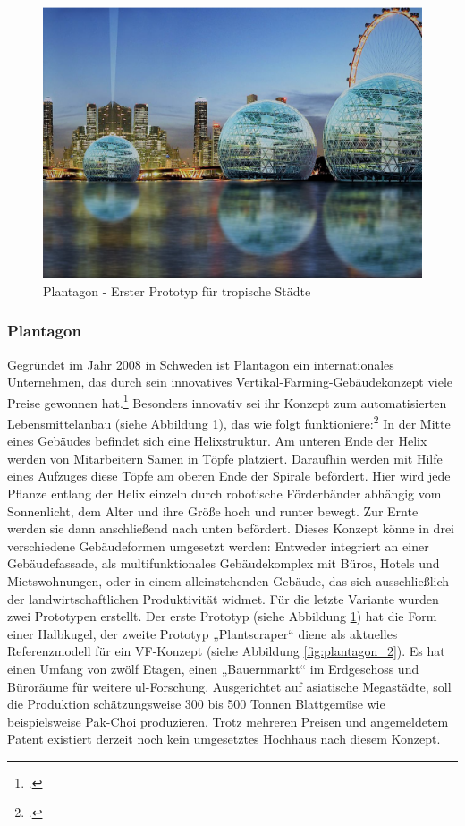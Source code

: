 \documentclass{scrartcl}
\begin{document}
\begin{figure}[htbp]
    \centering
    \includegraphics[width=12cm]{image_folder/plantagon.png}
  \caption{Plantagon - Erster Prototyp für tropische Städte}
  \label{fig:plantagon}
\end{figure} 

\subsubsection{Plantagon}

Gegründet im Jahr 2008 in Schweden ist Plantagon ein internationales Unternehmen, das durch sein innovatives Vertikal-Farming-Gebäudekonzept viele Preise gewonnen hat.\footcite[Vgl.]{PlantagonAwardsPlantagon} Besonders innovativ sei ihr Konzept zum automatisierten Lebensmittelanbau (siehe Abbildung \ref{fig:plantagon}), das wie folgt funktioniere:\footcite[Vgl.][S.21f]{Al-Kodmany2018TheCity}  In der Mitte eines Gebäudes befindet sich eine Helixstruktur. Am unteren Ende der Helix werden von Mitarbeitern Samen in Töpfe platziert. Daraufhin werden mit Hilfe eines Aufzuges diese Töpfe am oberen Ende der Spirale befördert. Hier wird jede Pflanze entlang der Helix einzeln durch robotische Förderbänder abhängig vom Sonnenlicht, dem Alter und ihre Größe hoch und runter bewegt. Zur Ernte werden sie dann anschließend nach unten befördert. Dieses Konzept könne in drei verschiedene Gebäudeformen umgesetzt werden: Entweder integriert an einer Gebäudefassade, als multifunktionales Gebäudekomplex mit Büros, Hotels und Mietswohnungen, oder in einem alleinstehenden Gebäude, das sich ausschließlich der landwirtschaftlichen Produktivität widmet. Für die letzte Variante wurden zwei Prototypen erstellt. Der erste Prototyp (siehe Abbildung \ref{fig:plantagon}) hat die Form einer Halbkugel, der zweite Prototyp „Plantscraper“ diene als aktuelles Referenzmodell für ein VF-Konzept (siehe Abbildung \ref{fig:plantagon_2}). Es hat einen Umfang von zwölf Etagen, einen „Bauernmarkt“ im Erdgeschoss und Büroräume für weitere \acs{ul}-Forschung. Ausgerichtet auf asiatische Megastädte, soll die Produktion schätzungsweise 300 bis 500 Tonnen Blattgemüse wie beispielsweise Pak-Choi produzieren. Trotz mehreren Preisen und angemeldetem Patent existiert derzeit noch kein umgesetztes Hochhaus nach diesem Konzept.
\end{document}
